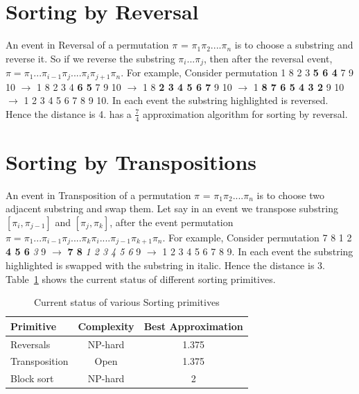 \documentclass[BTech]{iitmdiss}
\begin{document}
\section{Sorting by Reversal}
An event in Reversal of a permutation $\pi$ = $\pi_1\pi_2....\pi_n$ is to choose a substring and reverse it. So if we reverse the substring $\pi_i...\pi_j$, then after the reversal event, $\pi = \pi_1...\pi_{i-1}\pi_j....\pi_i\pi_{j+1}\pi_n$. For example, Consider permutation 1 8 2 3 \textbf{5 6 4} 7 9 10 $\rightarrow$ 1 8 2 3 4 \textbf{6 5} 7 9 10 $\rightarrow$ 1 8 \textbf{2 3 4 5 6 7} 9 10 $\rightarrow$ 1 \textbf{8 7 6 5 4 3 2} 9 10 $\rightarrow$ 1 2 3 4 5 6 7 8 9 10. In each event the substring highlighted is reversed. Hence the distance is 4. \citep{bafna1996genome} has a $\frac{7}{4}$ approximation algorithm for sorting by reversal.

\section{Sorting by Transpositions}
An event in Transposition of a permutation $\pi$ = $\pi_1\pi_2....\pi_n$ is to choose two adjacent substring and swap them. Let say in an event we transpose substring $[\pi_i,\pi_{j-1}]$ and $[\pi_j,\pi_k]$, after the event permutation $\pi = \pi_1...\pi_{i-1}\pi_j....\pi_k\pi_i....\pi_{j-1}\pi_{k+1}\pi_n$. For example, Consider permutation 7 8 1 2 \textbf{4 5 6} \textit{3} 9 $\rightarrow$ \textbf{7 8} \textit{1 2 3 4 5 6} 9 $\rightarrow$ 1 2 3 4 5 6 7 8 9. In each event the substring highlighted is swapped with the substring in italic. Hence the distance is 3.\\
Table~\ref{tab:sample} shows the current status of different sorting primitives.

\begin{table}[htbp]
  \caption{Current status of various Sorting primitives}
  \begin{center}
  \begin{tabular}[c]{|l|c|c|} \hline
    \textbf{Primitive} & \textbf{Complexity} & \textbf{Best Approximation}\\ \hline
    Reversals & NP-hard & 1.375  \\ \hline
    Transposition & Open & 1.375 \\ \hline
    Block sort & NP-hard & 2 \\ \hline
  \end{tabular}
  \label{tab:sample}
  \end{center}
\end{table}
\end{document}
